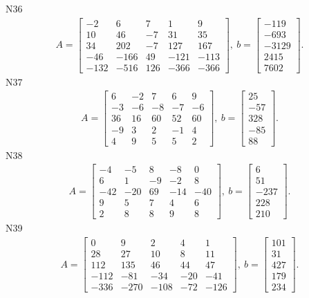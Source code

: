 \documentclass[11pt]{report}
\begin{document}
N36
\begin{align*}
 A = \left[\begin{matrix}-2 & 6 & 7 & 1 & 9\\10 & 46 & -7 & 31 & 35\\34 & 202 & -7 & 127 & 167\\-46 & -166 & 49 & -121 & -113\\-132 & -516 & 126 & -366 & -366\end{matrix}\right],
\ b = \left[\begin{matrix}-119\\-693\\-3129\\2415\\7602\end{matrix}\right]. 
 \end{align*}
N37
\begin{align*}
 A = \left[\begin{matrix}6 & -2 & 7 & 6 & 9\\-3 & -6 & -8 & -7 & -6\\36 & 16 & 60 & 52 & 60\\-9 & 3 & 2 & -1 & 4\\4 & 9 & 5 & 5 & 2\end{matrix}\right],
\ b = \left[\begin{matrix}25\\-57\\328\\-85\\88\end{matrix}\right]. 
 \end{align*}
N38
\begin{align*}
 A = \left[\begin{matrix}-4 & -5 & 8 & -8 & 0\\6 & 1 & -9 & -2 & 8\\-42 & -20 & 69 & -14 & -40\\9 & 5 & 7 & 4 & 6\\2 & 8 & 8 & 9 & 8\end{matrix}\right],
\ b = \left[\begin{matrix}6\\51\\-237\\228\\210\end{matrix}\right]. 
 \end{align*}
N39
\begin{align*}
 A = \left[\begin{matrix}0 & 9 & 2 & 4 & 1\\28 & 27 & 10 & 8 & 11\\112 & 135 & 46 & 44 & 47\\-112 & -81 & -34 & -20 & -41\\-336 & -270 & -108 & -72 & -126\end{matrix}\right],
\ b = \left[\begin{matrix}101\\31\\427\\179\\234\end{matrix}\right]. 
 \end{align*}
\end{document}
